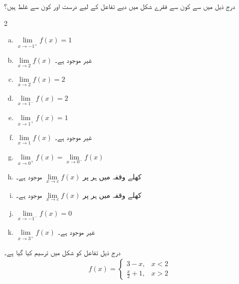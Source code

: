 درج ذیل میں سے کون سے فقرے شکل  میں دیے تفاعل کے لیے درست اور کون سے غلط ہیں؟
\begin{multicols}{2}
\begin{enumerate}[a.]
\item
$\lim\limits_{x\to -1^+}f(x)=1$
\item
$\lim\limits_{x\to 2}f(x)$
غیر موجود ہے۔
\item
$\lim\limits_{x\to 2}f(x)=2$
\item
$\lim\limits_{x\to 1^-}f(x)=2$
\item
$\lim\limits_{x\to 1^+}f(x)=1$
\item
$\lim\limits_{x\to 1}f(x)$
غیر موجود ہے۔
\item
$\lim\limits_{x\to 0^+}f(x)=\lim\limits_{x\to 0^-}f(x)$
\item
کھلے وقفہ  میں ہر  پر 
$\lim\limits_{x\to c}f(x)$
موجود ہے۔
\item
کھلے وقفہ  میں ہر  پر 
$\lim\limits_{x\to c}f(x)$
موجود ہے۔
\item
$\lim\limits_{x\to -1^-}f(x)=0$
\item
$\lim\limits_{x\to 3^+}f(x)$
غیر موجود ہے۔
\end{enumerate}
\end{multicols}
درج ذیل تفاعل کو شکل  میں ترسیم کیا گیا ہے۔
\begin{align*}
f(x)=\begin{cases} 3-x,&x<2\\ \tfrac{x}{2}+1,&x>2 \end{cases}
\end{align*}
